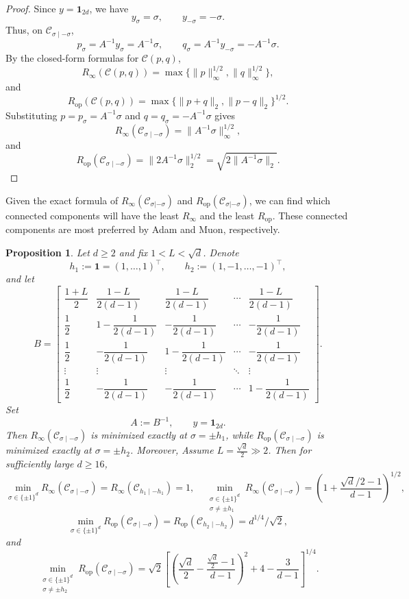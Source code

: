 \documentclass{article}
\newtheorem{proposition}{Proposition}[section]
\newcommand{\op}{\mathrm{op}}
\begin{document}
\begin{proof}
Since $y=\mathbf 1_{2d}$, we have
\[
y_\sigma=\sigma,
\qquad
y_{-\sigma}=-\sigma.
\]
Thus, on $\mathcal C_{\sigma\mid-\sigma}$,
\[
p_\sigma=A^{-1}y_\sigma=A^{-1}\sigma,
\qquad
q_\sigma=A^{-1}y_{-\sigma}=-A^{-1}\sigma.
\]
By the closed-form formulas for $\mathcal C(p,q)$,
\[
R_\infty(\mathcal C(p,q))
=
\max\{\|p\|_\infty^{1/2},\|q\|_\infty^{1/2}\},
\]
and
\[
R_{\mathrm{op}}(\mathcal C(p,q))
=
\max\{\|p+q\|_2,\|p-q\|_2\}^{1/2}.
\]
Substituting $p=p_\sigma=A^{-1}\sigma$ and $q=q_\sigma=-A^{-1}\sigma$ gives
\[
R_\infty(\mathcal C_{\sigma\mid-\sigma})
=
\|A^{-1}\sigma\|_\infty^{1/2},
\]
and
\[
R_{\mathrm{op}}(\mathcal C_{\sigma\mid-\sigma})
=
\|2A^{-1}\sigma\|_2^{1/2}
=
\sqrt{2\|A^{-1}\sigma\|_2}.
\]
\end{proof}

Given the exact formula of $R_{\infty}(\mathcal{C}_{\sigma | -\sigma})$ and $R_{\op}(\mathcal{C}_{\sigma | -\sigma})$, we can find which connected components will have the least $R_{\infty}$ and the least $R_{\op}$. These connected components are most preferred by Adam and Muon, respectively. 

\begin{proposition}
\label{prop5:computation}
Let $d\ge2$ and fix $1<L<\sqrt d$.
Denote
\[
h_1:=\mathbf 1=(1,\dots,1)^\top,
\qquad
h_2:=(1,-1,\dots,-1)^\top,
\]
and let
\[
B =
\begin{bmatrix}
\dfrac{1+L}{2}
&
\dfrac{1-L}{2(d-1)}
&
\dfrac{1-L}{2(d-1)}
&
\cdots
&
\dfrac{1-L}{2(d-1)}
\\[6pt]
\dfrac12
&
1-\dfrac{1}{2(d-1)}
&
-\dfrac{1}{2(d-1)}
&
\cdots
&
-\dfrac{1}{2(d-1)}
\\[6pt]
\dfrac12
&
-\dfrac{1}{2(d-1)}
&
1-\dfrac{1}{2(d-1)}
&
\cdots
&
-\dfrac{1}{2(d-1)}
\\
\vdots
&
\vdots
&
\vdots
&
\ddots
&
\vdots
\\[4pt]
\dfrac12
&
-\dfrac{1}{2(d-1)}
&
-\dfrac{1}{2(d-1)}
&
\cdots
&
1-\dfrac{1}{2(d-1)}
\end{bmatrix}.
\]
Set
\[
A:=B^{-1},
\qquad
y=\mathbf 1_{2d}.
\]
Then $R_\infty(\mathcal C_{\sigma\mid-\sigma})$
is minimized exactly at $\sigma=\pm h_1$, while
$
R_{\mathrm{op}}(\mathcal C_{\sigma\mid-\sigma})
$
is minimized exactly at $\sigma=\pm h_2$. Moreover, 
Assume $L=\frac{\sqrt d}{2}\gg 2$. Then for sufficiently large $d \geq 16$,
\[
\min_{\sigma\in\{\pm1\}^d}
R_\infty(\mathcal C_{\sigma\mid-\sigma})
=
R_\infty(\mathcal C_{h_1\mid-h_1})
=
1, \quad 
\min_{\substack{\sigma\in\{\pm1\}^d\\ \sigma\neq \pm h_1}}
R_\infty(\mathcal C_{\sigma\mid-\sigma})
=
\left(
1+\frac{\sqrt d/2-1}{d-1}
\right)^{1/2},
\]
\[
\min_{\sigma\in\{\pm1\}^d}
R_{\mathrm{op}}(\mathcal C_{\sigma\mid-\sigma})
=
R_{\mathrm{op}}(\mathcal C_{h_2\mid-h_2})
=
d^{1/4}/\sqrt{2},
\]
and
\[
\min_{\substack{\sigma\in\{\pm1\}^d\\ \sigma\neq \pm h_2}}
R_{\mathrm{op}}(\mathcal C_{\sigma\mid-\sigma})
=
\sqrt2
\left[
\left(
\frac{\sqrt d}{2}
-
\frac{\frac{\sqrt d}{2}-1}{d-1}
\right)^2
+
4-\frac{3}{d-1}
\right]^{1/4}.
\]
\end{proposition}
\end{document}
